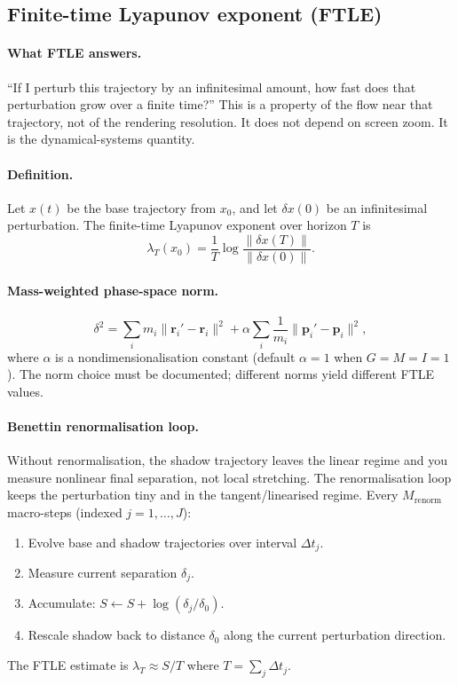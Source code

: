 \documentclass[11pt]{report}
\begin{document}
\subsection{Finite-time Lyapunov exponent (FTLE)}
\label{sec:ftle}

\paragraph{What FTLE answers.} ``If I perturb this trajectory by an infinitesimal amount, how fast does that perturbation grow over a finite time?'' This is a property of the flow near that trajectory, not of the rendering resolution. It does not depend on screen zoom. It is the dynamical-systems quantity.

\paragraph{Definition.} Let $x(t)$ be the base trajectory from $x_0$, and let $\delta x(0)$ be an infinitesimal perturbation. The finite-time Lyapunov exponent over horizon $T$ is
\[
\lambda_T(x_0)=\frac{1}{T}\log\frac{\|\delta x(T)\|}{\|\delta x(0)\|}.
\]

\paragraph{Mass-weighted phase-space norm.}
\[
\delta^2=\sum_i m_i\|\mathbf r_i'-\mathbf r_i\|^2+\alpha\sum_i\frac{1}{m_i}\|\mathbf p_i'-\mathbf p_i\|^2,
\]
where $\alpha$ is a nondimensionalisation constant (default $\alpha=1$ when $G=M=I=1$). The norm choice must be documented; different norms yield different FTLE values.

\paragraph{Benettin renormalisation loop.} Without renormalisation, the shadow trajectory leaves the linear regime and you measure nonlinear final separation, not local stretching. The renormalisation loop keeps the perturbation tiny and in the tangent/linearised regime. Every $M_{\mathrm{renorm}}$ macro-steps (indexed $j=1,\ldots,J$):
\begin{enumerate}[nosep]
\item Evolve base and shadow trajectories over interval $\Delta t_j$.
\item Measure current separation $\delta_j$.
\item Accumulate: $S\leftarrow S+\log(\delta_j/\delta_0)$.
\item Rescale shadow back to distance $\delta_0$ along the current perturbation direction.
\end{enumerate}
The FTLE estimate is $\lambda_T\approx S/T$ where $T=\sum_j\Delta t_j$.
\end{document}

